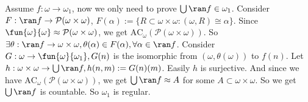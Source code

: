 \documentclass{ctexart}
\begin{document}
  Assume \(f: \omega \to \omega_1\), now we only need to prove \( \bigcup \ran f \in \omega_1\). 
  Consider \(F:\ran f \to \mathcal{P}(\omega \times \omega)\), \(F(\alpha):=\{R \subset \omega \times \omega:(\omega,R)\cong \alpha\}\). 
  Since \(\fun{\omega}{\omega}\approx \mathcal{P}(\omega \times \omega)\), we get \(\text{AC}_\omega(\mathcal{P}(\omega \times \omega))\). 
  So \(\exists \theta:\ran f \to \omega \times \omega,\theta(\alpha) \in F(\alpha),\forall \alpha \in \ran f\). 
  Consider \(G:\omega \to \fun{\omega}{\omega_1},G(n)\) is the isomorphic from \((\omega,\theta(\omega))\) to \(f(n)\). 
  Let \(h:\omega \times \omega \to \bigcup \ran f,h(n,m):=G(n)(m) \). Easily \(h\) is surjective. 
  And since we have \(\text{AC}_\omega(\mathcal{P}(\omega \times \omega))\), we get \(\bigcup \ran f \approx A \) for some \(A \subset \omega \times \omega\). 
  So we get \(\bigcup \ran f \) is countable. So \(\omega_1\) is regular. 
\end{document}

